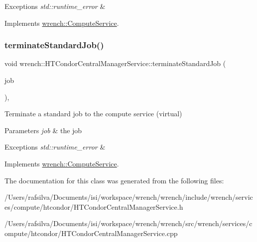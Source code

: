 \begin{DoxyExceptions}{Exceptions}
{\em std\+::runtime\+\_\+error} & \\
\hline
\end{DoxyExceptions}


Implements \hyperlink{classwrench_1_1_compute_service}{wrench\+::\+Compute\+Service}.

\mbox{\label{classwrench_1_1_h_t_condor_central_manager_service_aa88a7ea5ddd715053c026b94efde25f0}} 
\subsubsection{\texorpdfstring{terminate\+Standard\+Job()}{terminateStandardJob()}}
{\footnotesize\ttfamily void wrench\+::\+H\+T\+Condor\+Central\+Manager\+Service\+::terminate\+Standard\+Job (\begin{DoxyParamCaption}\item[{\hyperlink{classwrench_1_1_standard_job}{Standard\+Job} $\ast$}]{job }\end{DoxyParamCaption})\hspace{0.3cm}{\ttfamily [override]}, {\ttfamily [virtual]}}



Terminate a standard job to the compute service (virtual) 


\begin{DoxyParams}{Parameters}
{\em job} & the job\\
\hline
\end{DoxyParams}

\begin{DoxyExceptions}{Exceptions}
{\em std\+::runtime\+\_\+error} & \\
\hline
\end{DoxyExceptions}


Implements \hyperlink{classwrench_1_1_compute_service}{wrench\+::\+Compute\+Service}.



The documentation for this class was generated from the following files\+:\begin{DoxyCompactItemize}
\item 
/\+Users/rafsilva/\+Documents/isi/workspace/wrench/wrench/include/wrench/services/compute/htcondor/H\+T\+Condor\+Central\+Manager\+Service.\+h\item 
/\+Users/rafsilva/\+Documents/isi/workspace/wrench/wrench/src/wrench/services/compute/htcondor/H\+T\+Condor\+Central\+Manager\+Service.\+cpp\end{DoxyCompactItemize}
